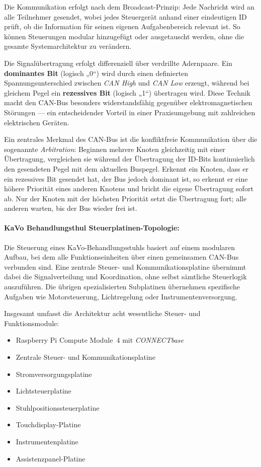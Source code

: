 Die Kommunikation erfolgt nach dem Broadcast-Prinzip: Jede Nachricht wird an alle Teilnehmer gesendet, wobei jedes Steuergerät anhand einer eindeutigen ID prüft, ob die Information für seinen eigenen Aufgabenbereich relevant ist. So können Steuerungen modular hinzugefügt oder ausgetauscht werden, ohne die gesamte Systemarchitektur zu verändern.

Die Signalübertragung erfolgt differenziell über verdrillte Adernpaare. Ein \textbf{dominantes Bit} (logisch „0“) wird durch einen definierten Spannungsunterschied zwischen \textit{CAN High} und \textit{CAN Low} erzeugt, während bei gleichem Pegel ein \textbf{rezessives Bit} (logisch „1“) übertragen wird. Diese Technik macht den CAN-Bus besonders widerstandsfähig gegenüber elektromagnetischen Störungen — ein entscheidender Vorteil in einer Praxisumgebung mit zahlreichen elektrischen Geräten.

Ein zentrales Merkmal des CAN-Bus ist die konfliktfreie Kommunikation über die sogenannte \textit{Arbitration}: Beginnen mehrere Knoten gleichzeitig mit einer Übertragung, vergleichen sie während der Übertragung der ID-Bits kontinuierlich den gesendeten Pegel mit dem aktuellen Buspegel. Erkennt ein Knoten, dass er ein rezessives Bit gesendet hat, der Bus jedoch dominant ist, so erkennt er eine höhere Priorität eines anderen Knotens und bricht die eigene Übertragung sofort ab. Nur der Knoten mit der höchsten Priorität setzt die Übertragung fort; alle anderen warten, bis der Bus wieder frei ist.

\paragraph{KaVo Behandlungsthul Steuerplatinen-Topologie:}

\leavevmode

Die Steuerung eines KaVo-Behandlungsstuhls basiert auf einem modularen Aufbau, bei dem alle Funktionseinheiten über einen gemeinsamen CAN-Bus verbunden sind. Eine zentrale Steuer- und Kommunikationsplatine übernimmt dabei die Signalverteilung und Koordination, ohne selbst sämtliche Steuerlogik auszuführen. Die übrigen spezialisierten Subplatinen übernehmen spezifische Aufgaben wie Motorsteuerung, Lichtregelung oder Instrumentenversorgung.

Insgesamt umfasst die Architektur acht wesentliche Steuer- und Funktionsmodule:
\begin{itemize}
    \item Raspberry Pi Compute Module~4 mit \textit{CONNECTbase}
    \item Zentrale Steuer- und Kommunikationsplatine
    \item Stromversorgungsplatine
    \item Lichtsteuerplatine
    \item Stuhlpositionssteuerplatine
    \item Touchdisplay-Platine
    \item Instrumentenplatine
    \item Assistenzpanel-Platine
\end{itemize}

